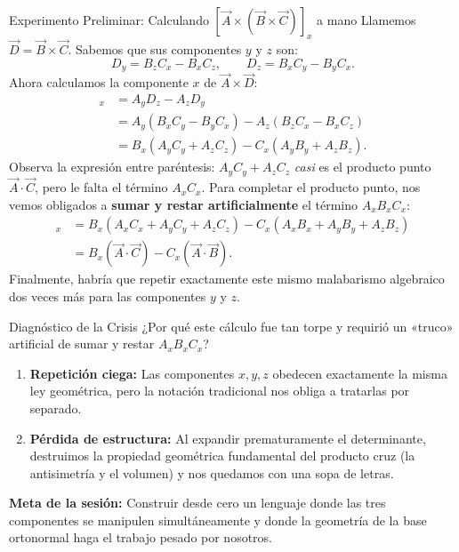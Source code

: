 \documentclass[11pt,letterpaper]{article}
\begin{document}
\begin{examplebox}{Experimento Preliminar: Calculando $[\vec{A}\times(\vec{B}\times\vec{C})]_x$ a mano}
Llamemos $\vec{D} = \vec{B} \times \vec{C}$. Sabemos que sus componentes $y$ y $z$ son:
\[
D_y = B_z C_x - B_x C_z, \qquad D_z = B_x C_y - B_y C_x.
\]
Ahora calculamos la componente $x$ de $\vec{A} \times \vec{D}$:
\begin{align*}
[\vec{A} \times (\vec{B} \times \vec{C})]_x &= A_y D_z - A_z D_y \\
&= A_y(B_x C_y - B_y C_x) - A_z(B_z C_x - B_x C_z) \\
&= B_x(A_y C_y + A_z C_z) - C_x(A_y B_y + A_z B_z).
\end{align*}
Observa la expresión entre paréntesis: $A_y C_y + A_z C_z$ \textit{casi} es el producto punto $\vec{A}\cdot\vec{C}$, pero le falta el término $A_x C_x$. Para completar el producto punto, nos vemos obligados a \textbf{sumar y restar artificialmente} el término $A_x B_x C_x$:
\begin{align*}
[\vec{A} \times (\vec{B} \times \vec{C})]_x &= B_x(A_x C_x + A_y C_y + A_z C_z) - C_x(A_x B_x + A_y B_y + A_z B_z) \\
&= B_x(\vec{A}\cdot\vec{C}) - C_x(\vec{A}\cdot\vec{B}).
\end{align*}
Finalmente, habría que repetir exactamente este mismo malabarismo algebraico dos veces más para las componentes $y$ y $z$.
\end{examplebox}

\begin{intuitionbox}{Diagnóstico de la Crisis}
¿Por qué este cálculo fue tan torpe y requirió un «truco» artificial de sumar y restar $A_x B_x C_x$?
\begin{enumerate}
    \item \textbf{Repetición ciega:} Las componentes $x, y, z$ obedecen exactamente la misma ley geométrica, pero la notación tradicional nos obliga a tratarlas por separado.
    \item \textbf{Pérdida de estructura:} Al expandir prematuramente el determinante, destruimos la propiedad geométrica fundamental del producto cruz (la antisimetría y el volumen) y nos quedamos con una sopa de letras.
\end{enumerate}
\textbf{Meta de la sesión:} Construir desde cero un lenguaje donde las tres componentes se manipulen simultáneamente y donde la geometría de la base ortonormal haga el trabajo pesado por nosotros.
\end{intuitionbox}
\end{document}
